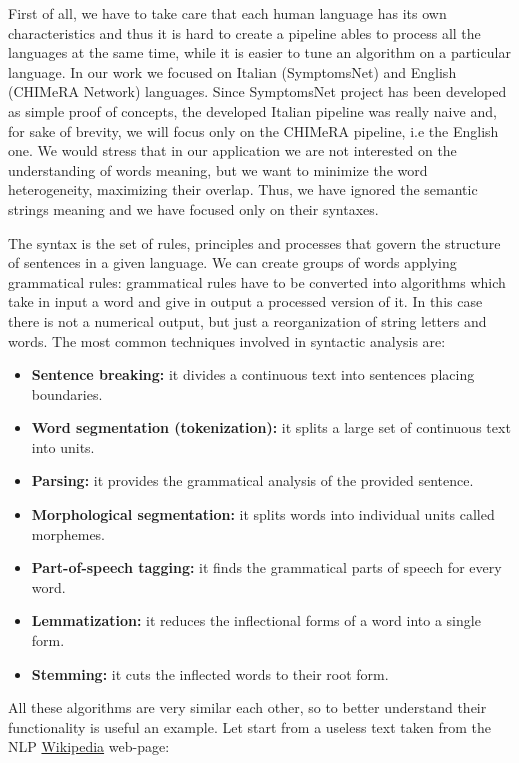 \documentclass{standalone}
\begin{document}
First of all, we have to take care that each human language has its own characteristics and thus it is hard to create a pipeline ables to process all the languages at the same time, while it is easier to tune an algorithm on a particular language.
In our work we focused on Italian (\textsf{SymptomsNet}) and English (\textsf{CHIMeRA} Network) languages.
Since \textsf{SymptomsNet} project has been developed as simple proof of concepts, the developed Italian pipeline was really naive and, for sake of brevity, we will focus only on the \textsf{CHIMeRA} pipeline, i.e the English one.
We would stress that in our application we are not interested on the understanding of words meaning, but we want to minimize the word heterogeneity, maximizing their overlap.
Thus, we have ignored the semantic strings meaning and we have focused only on their syntaxes.

The syntax is the set of rules, principles and processes that govern the structure of sentences in a given language.
We can create groups of words applying grammatical rules: grammatical rules have to be converted into algorithms which take in input a word and give in output a processed version of it.
In this case there is not a numerical output, but just a reorganization of string letters and words.
The most common techniques involved in syntactic analysis are:

\begin{itemize}

  \item \textbf{Sentence breaking:} it divides a continuous text into sentences placing boundaries.
  \item \textbf{Word segmentation (tokenization):} it splits a large set of continuous text into units.
  \item \textbf{Parsing:} it provides the grammatical analysis of the provided sentence.
  \item \textbf{Morphological segmentation:} it splits words into individual units called morphemes.
  \item \textbf{Part-of-speech tagging:} it finds the grammatical parts of speech for every word.
  \item \textbf{Lemmatization:} it reduces the inflectional forms of a word into a single form.
  \item \textbf{Stemming:} it cuts the inflected words to their root form.

\end{itemize}

All these algorithms are very similar each other, so to better understand their functionality is useful an example.
Let start from a useless text taken from the NLP \href{https://en.wikipedia.org/wiki/Natural_language_processing}{Wikipedia} web-page:
\end{document}
